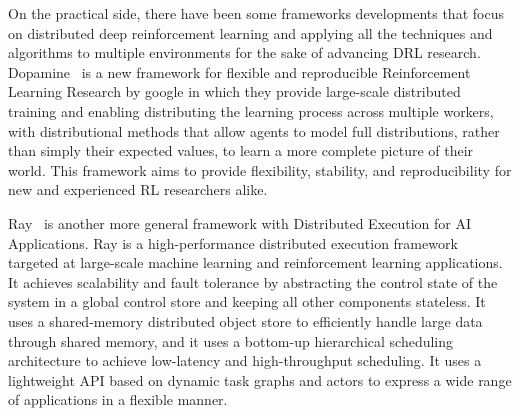 On the practical side, there have been some frameworks developments that focus on distributed deep reinforcement learning and applying all the techniques and algorithms to multiple environments for the sake of advancing DRL research. Dopamine~\parencite{castro2018dopamine} is a new framework for flexible and reproducible Reinforcement Learning Research by google in which they provide large-scale distributed training and enabling distributing the learning process across multiple workers, with distributional methods that allow agents to model full distributions, rather than simply their expected values, to learn a more complete picture of their world. This framework aims to provide flexibility, stability, and reproducibility for new and experienced RL researchers alike. 

Ray~\parencite{moritz2018ray} is another more general framework with Distributed Execution for AI Applications. Ray is a high-performance distributed execution framework targeted at large-scale machine learning and reinforcement learning applications. It achieves scalability and fault tolerance by abstracting the control state of the system in a global control store and keeping all other components stateless. It uses a shared-memory distributed object store to efficiently handle large data through shared memory, and it uses a bottom-up hierarchical scheduling architecture to achieve low-latency and high-throughput scheduling. It uses a lightweight API based on dynamic task graphs and actors to express a wide range of applications in a flexible manner.
